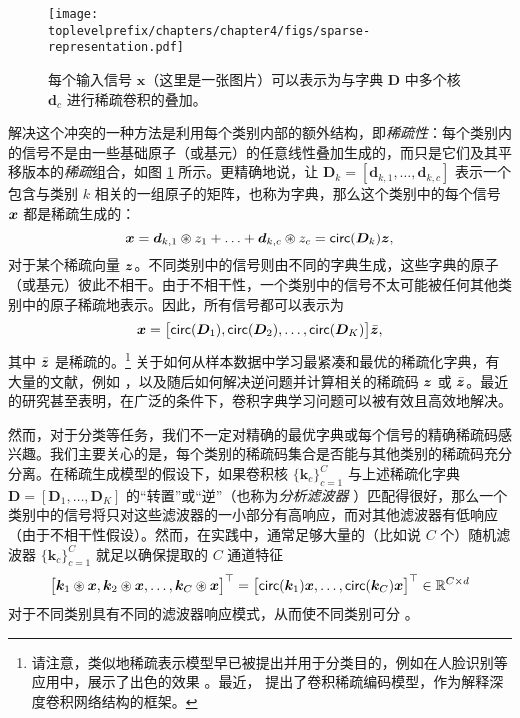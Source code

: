 \documentclass[../../book-main_zh.tex]{subfiles}
\begin{document}
\begin{figure}[t]
	\centerline{
\texttt{[image: \\toplevelprefix/chapters/chapter4/figs/sparse-representation.pdf]}}
	\caption{每个输入信号 $\bm x$（这里是一张图片）可以表示为与字典 $\bm D$ 中多个核 $\bm d_c$ 进行稀疏卷积的叠加。}
	\label{fig:multi-channel-sparse-representation}
\end{figure}
解决这个冲突的一种方法是利用每个类别内部的额外结构，即{\em 稀疏性}：每个类别内的信号不是由一些基础原子（或基元）的任意线性叠加生成的，而只是它们及其平移版本的{\em 稀疏}组合，如图 \ref{fig:multi-channel-sparse-representation} 所示。更精确地说，让 $\bm D_k = [\bm d_{k,1}, \ldots, \bm d_{k,c}]$ 表示一个包含与类别 $k$ 相关的一组原子的矩阵，也称为字典，那么这个类别中的每个信号 $\bm{x}$ 都是稀疏生成的：
\begin{equation}
    \bm{x} = \bm d_{k,1} \circledast z_1 + \ldots + \bm d_{k,c} \circledast z_c = \mathsf{circ}(\bm{D}_k)\bm{z},
\end{equation}
对于某个稀疏向量 $\bm{z}$。不同类别中的信号则由不同的字典生成，这些字典的原子（或基元）彼此不相干。由于不相干性，一个类别中的信号不太可能被任何其他类别中的原子稀疏地表示。因此，所有信号都可以表示为
\begin{equation}
\bm{x} = \big[\mathsf{circ}(\bm{D}_1), \mathsf{circ}(\bm{D}_2), \ldots, \mathsf{circ}(\bm{D}_K)\big] \bar {\bm{z}},
\end{equation}
其中 $\bar {\bm{z}}$ 是稀疏的。\footnote{请注意，类似地稀疏表示模型早已被提出并用于分类目的，例如在人脸识别等应用中，展示了出色的效果 \cite{Wright:2009,wagner2012toward}。最近，\cite{papyan2017convolutional} 提出了卷积稀疏编码模型，作为解释深度卷积网络结构的框架。} 关于如何从样本数据中学习最紧凑和最优的稀疏化字典，有大量的文献，例如 \cite{li2019multichannel,qu2019nonconvex}，以及随后如何解决逆问题并计算相关的稀疏码 $\bm{z}$ 或 $\bar {\bm{z}}$。最近 \cite{qu2020nonconvex,Qu2020Geometric} 的研究甚至表明，在广泛的条件下，卷积字典学习问题可以被有效且高效地解决。

然而，对于分类等任务，我们不一定对精确的最优字典或每个信号的精确稀疏码感兴趣。我们主要关心的是，每个类别的稀疏码集合是否能与其他类别的稀疏码充分分离。在稀疏生成模型的假设下，如果卷积核 $\{\bm k_c\}_{c=1}^C$ 与上述稀疏化字典 $\bm D = [\bm D_1, \ldots, \bm D_K]$ 的“转置”或“逆”（也称为{\em 分析滤波器} \cite{Cosparse-Nam,Analysis-Filter}）匹配得很好，那么一个类别中的信号将只对这些滤波器的一小部分有高响应，而对其他滤波器有低响应（由于不相干性假设）。然而，在实践中，通常足够大量的（比如说 $C$ 个）随机滤波器 $\{\bm k_c\}_{c=1}^C$ 就足以确保提取的 $C$ 通道特征
\begin{equation}
\big[\bm k_1 \circledast \bm{x}, \bm k_2 \circledast \bm{x}, \ldots, \bm k_C \circledast \bm{x}\big]^\top = \big[\mathsf{circ}(\bm k_1) \bm{x}, \ldots, \mathsf{circ}(\bm k_C) \bm{x} \big]^\top \in \mathbb{R}^{C\times d}
\end{equation}
对于不同类别具有不同的滤波器响应模式，从而使不同类别可分 \cite{chan2015pcanet}。
\end{document}
